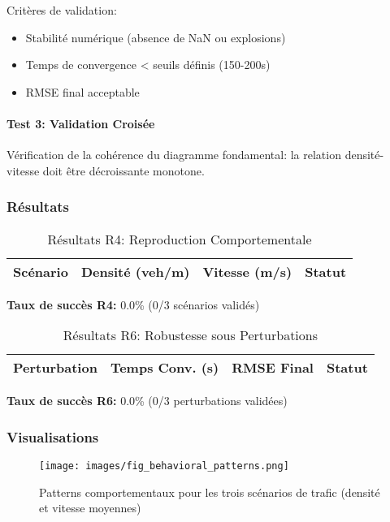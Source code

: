 Critères de validation:
\begin{itemize}
    \item Stabilité numérique (absence de NaN ou explosions)
    \item Temps de convergence < seuils définis (150-200s)
    \item RMSE final acceptable
\end{itemize}

\paragraph{Test 3: Validation Croisée}
Vérification de la cohérence du diagramme fondamental: la relation densité-vitesse doit être décroissante monotone.

\subsubsection{Résultats}


\begin{table}[htbp]
\centering
\caption{Résultats R4: Reproduction Comportementale}
\begin{tabular}{lccc}
\toprule
\textbf{Scénario} & \textbf{Densité (veh/m)} & \textbf{Vitesse (m/s)} & \textbf{Statut} \\
\midrule
\bottomrule
\end{tabular}
\end{table}


\textbf{Taux de succès R4:} 0.0\% (0/3 scénarios validés)


\begin{table}[htbp]
\centering
\caption{Résultats R6: Robustesse sous Perturbations}
\begin{tabular}{lccc}
\toprule
\textbf{Perturbation} & \textbf{Temps Conv. (s)} & \textbf{RMSE Final} & \textbf{Statut} \\
\midrule
\bottomrule
\end{tabular}
\end{table}


\textbf{Taux de succès R6:} 0.0\% (0/3 perturbations validées)


\subsubsection{Visualisations}

\begin{figure}[htbp]
\centering
\texttt{[image: images/fig\_behavioral\_patterns.png]}
\caption{Patterns comportementaux pour les trois scénarios de trafic (densité et vitesse moyennes)}
\label{fig:behavioral_patterns}
\end{figure}

